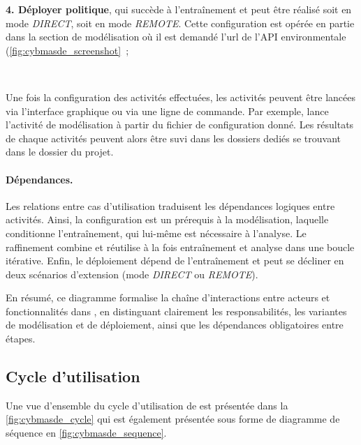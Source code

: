 \textbf{4. Déployer politique}, qui succède à l’entraînement et peut être réalisé soit en mode \textit{DIRECT}, soit en mode \textit{REMOTE}. Cette configuration est opérée en partie dans la section de modélisation où il est demandé l'url de l'API environmentale (\autoref{fig:cybmasde_screenshot}~;

\

Une fois la configuration des activités effectuées, les activités peuvent être lancées via l'interface graphique ou via une ligne de commande. Par exemple,  lance l'activité de modélisation à partir du fichier de configuration donné. Les résultats de chaque activités peuvent alors être suvi dans les dossiers dediés se trouvant dans le dossier du projet.


\paragraph{Dépendances.}
Les relations entre cas d’utilisation traduisent les dépendances logiques entre activités. Ainsi, la configuration est un prérequis à la modélisation, laquelle conditionne l’entraînement, qui lui-même est nécessaire à l’analyse. Le raffinement combine et réutilise à la fois entraînement et analyse dans une boucle itérative. Enfin, le déploiement dépend de l’entraînement et peut se décliner en deux scénarios d’extension (mode \textit{DIRECT} ou \textit{REMOTE}).

\medskip
En résumé, ce diagramme formalise la chaîne d’interactions entre acteurs et fonctionnalités dans , en distinguant clairement les responsabilités, les variantes de modélisation et de déploiement, ainsi que les dépendances obligatoires entre étapes.


\subsection{Cycle d'utilisation}

Une vue d'ensemble du cycle d'utilisation de  est présentée dans la \autoref{fig:cybmasde_cycle} qui est également présentée sous forme de diagramme de séquence en \autoref{fig:cybmasde_sequence}.

